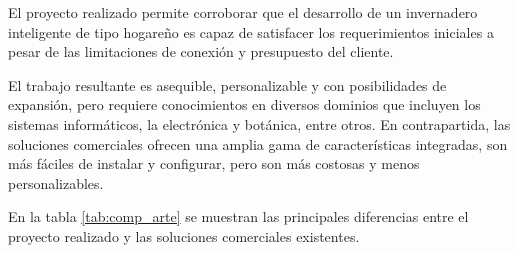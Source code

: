 El proyecto realizado permite corroborar que el desarrollo de un invernadero inteligente de tipo hogareño es capaz de satisfacer los requerimientos iniciales a pesar de las limitaciones de conexión y presupuesto del cliente.   


El trabajo resultante es asequible, personalizable y con posibilidades de expansión, pero requiere conocimientos en diversos dominios que incluyen los sistemas informáticos, la electrónica y botánica, entre otros. En contrapartida, las soluciones comerciales ofrecen una amplia gama de características integradas, son más fáciles de instalar y configurar, pero son más costosas y menos personalizables.

En la tabla \ref{tab:comp_arte} se muestran las principales diferencias entre el proyecto realizado y las soluciones comerciales existentes.



